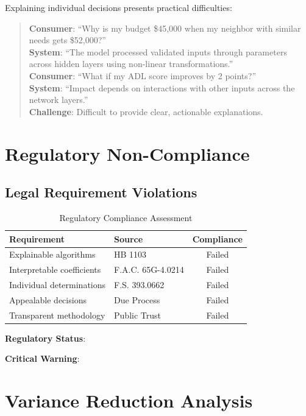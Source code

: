 Explaining individual decisions presents practical difficulties:

\begin{quote}
\textbf{Consumer}: ``Why is my budget \$45,000 when my neighbor with similar needs gets \$52,000?''\\[6pt]
\textbf{System}: ``The model processed \ModelTenRobustFeatures{} validated inputs through \ModelTenTotalParams{} parameters across \ModelTenHiddenLayers{} hidden layers using non-linear transformations.''\\[6pt]
\textbf{Consumer}: ``What if my ADL score improves by 2 points?''\\[6pt]
\textbf{System}: ``Impact depends on interactions with other inputs across the network layers.''\\[6pt]
\textbf{Challenge}: Difficult to provide clear, actionable explanations.
\end{quote}

\section{Regulatory Non-Compliance}

\subsection{Legal Requirement Violations}

\begin{table}[h]
\centering
\caption{Regulatory Compliance Assessment}
\begin{tabular}{llc}
\toprule
\textbf{Requirement} & \textbf{Source} & \textbf{Compliance} \\
\midrule
Explainable algorithms & HB 1103 & Failed \\
Interpretable coefficients & F.A.C. 65G-4.0214 & Failed \\
Individual determinations & F.S. 393.0662 & Failed \\
Appealable decisions & Due Process & Failed \\
Transparent methodology & Public Trust & Failed \\
\bottomrule
\end{tabular}
\end{table}

\textbf{Regulatory Status}: \ModelTenRegulatoryCompliant{}

\textbf{Critical Warning}: \ModelTenBlackBoxWarning{}

\section{Variance Reduction Analysis}

